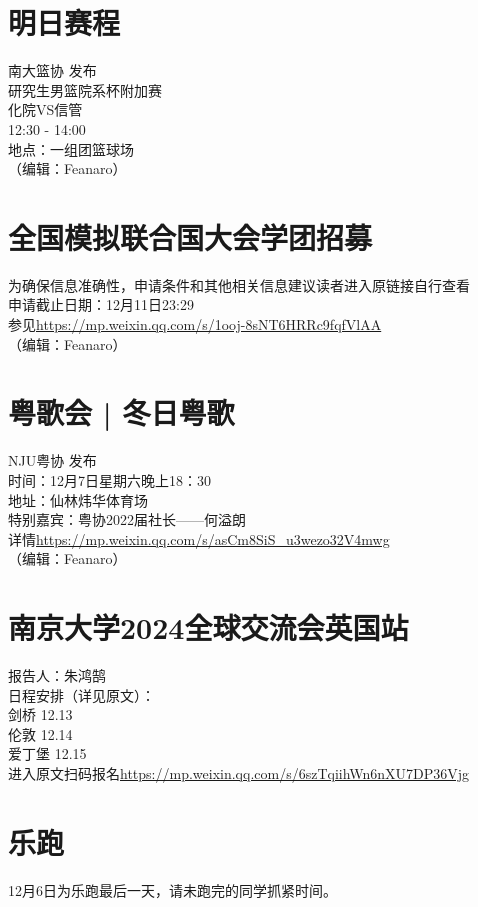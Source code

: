 \documentclass[letterpaper, 12pt]{article}
\begin{document}
\begin{multicols}{2}
\section{明日赛程}
南大篮协 发布\\
研究生男篮院系杯附加赛\\
化院VS信管\\
12:30 - 14:00\\
地点：一组团篮球场\\
（编辑：Feanaro）

\section{全国模拟联合国大会学团招募}
为确保信息准确性，申请条件和其他相关信息建议读者进入原链接自行查看\\
申请截止日期：12月11日23:29\\
参见\url{https://mp.weixin.qq.com/s/1ooj-8sNT6HRRc9fqfVlAA}\\
（编辑：Feanaro）

\section{粤歌会 | 冬日粤歌}
NJU粤协 发布\\
时间：12月7日星期六晚上18：30\\
地址：仙林炜华体育场\\
特别嘉宾：粤协2022届社长——何溢朗\\
详情\url{https://mp.weixin.qq.com/s/asCm8SiS_u3wezo32V4mwg}\\
（编辑：Feanaro）

\section{南京大学2024全球交流会英国站}
报告人：朱鸿鹄\\
日程安排（详见原文）：\\
剑桥 12.13\\
伦敦 12.14\\
爱丁堡 12.15\\
进入原文扫码报名\url{https://mp.weixin.qq.com/s/6szTqiihWn6nXU7DP36Vjg}
\section{乐跑}
12月6日为乐跑最后一天，请未跑完的同学抓紧时间。




\end{multicols} 
\end{document}
